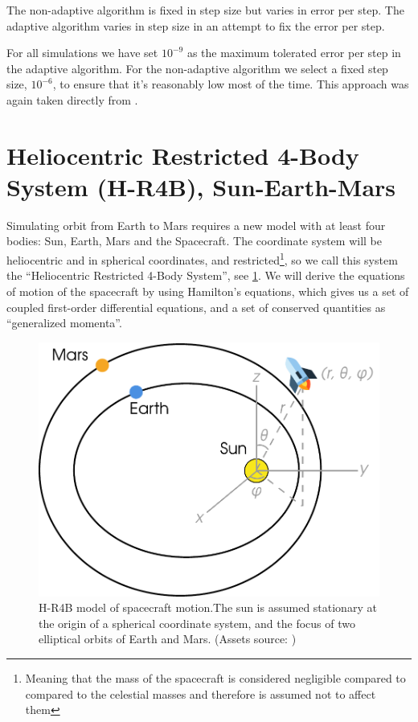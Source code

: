 The non-adaptive algorithm is fixed in step size but varies in error per step.
The adaptive algorithm varies in step size in an attempt to fix the error per step.

For all simulations we have set $10^{-9}$ as the maximum tolerated error per step in the adaptive algorithm. For the non-adaptive algorithm we select a fixed step size, $10^{-6}$, to ensure that it's reasonably low most of the time. This approach was again taken directly from \cite{Saxe2015}.

\section{Heliocentric Restricted 4-Body System (H-R4B), Sun-Earth-Mars}
Simulating orbit from Earth to Mars requires a new model with at least four bodies: Sun, Earth, Mars and the Spacecraft. The coordinate system will be heliocentric and in spherical coordinates, and restricted\footnote{Meaning that the mass of the spacecraft is considered negligible compared to compared to the celestial masses and therefore is assumed not to affect them}, so we call this system the ``Heliocentric Restricted 4-Body System'', see \cref{fig:solar-system-model}. We will derive the equations of motion of the spacecraft by using Hamilton's equations, which gives us a set of coupled first-order differential equations, and a set of conserved quantities as ``generalized momenta''.

\begin{figure}[ht]
    \centering
    \includegraphics[width=0.80\linewidth]{fig/solar-system-model}
    \caption{ H-R4B model of spacecraft motion.The sun is assumed stationary at the origin of a spherical coordinate system, and the focus of two elliptical orbits of Earth and Mars. (Assets source: \cite{WikiSpherical,flaticon})}
    \label{fig:solar-system-model}
\end{figure}

